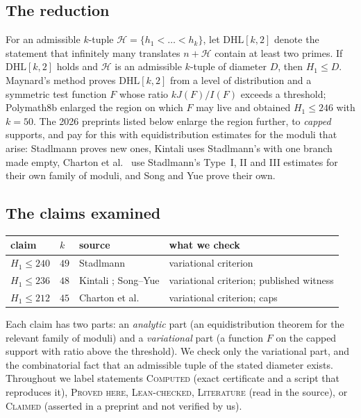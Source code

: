 \documentclass[11pt]{amsart}
\theoremstyle{definition}
\theoremstyle{remark}
\newcommand{\lbl}[1]{\textup{\textsc{#1}}}
\newcommand{\DHL}{\mathrm{DHL}}
\begin{document}
\subsection*{The reduction}
For an admissible $k$-tuple $\mathcal H=\{h_1<\dots<h_k\}$, let $\DHL[k,2]$
denote the statement that infinitely many translates $n+\mathcal H$ contain at
least two primes. If $\DHL[k,2]$ holds and $\mathcal H$ is an admissible
$k$-tuple of diameter $D$, then $H_1\le D$. Maynard's method \cite{May15}
proves $\DHL[k,2]$ from a level of distribution and a symmetric test function
$F$ whose ratio $kJ(F)/I(F)$ exceeds a threshold; Polymath8b \cite{Pol14b}
enlarged the region on which $F$ may live and obtained $H_1\le246$ with
$k=50$. The 2026 preprints listed below enlarge the region further, to
\emph{capped} supports, and pay for this with equidistribution estimates
for the moduli that arise: Stadlmann \cite{Sta26} proves new ones, Kintali
\cite{Kin26} uses Stadlmann's \cite[Prop.~3]{Sta26} with one branch made empty,
Charton et al.\ \cite{Cha26} use Stadlmann's Type~I, II and III estimates for
their own family of moduli, and Song and Yue \cite{SY26} prove their own.

\subsection*{The claims examined}
\begin{center}
\begin{tabular}{@{}llll@{}}
\toprule
claim & $k$ & source & what we check\\
\midrule
$H_1\le240$ & $49$ & Stadlmann \cite{Sta26} & variational criterion\\
$H_1\le236$ & $48$ & Kintali \cite{Kin26}; Song--Yue \cite{SY26} & variational criterion; published witness\\
$H_1\le212$ & $45$ & Charton et al.\ \cite{Cha26} & variational criterion; caps\\
\bottomrule
\end{tabular}
\end{center}
Each claim has two parts: an \emph{analytic} part (an equidistribution
theorem for the relevant family of moduli) and a \emph{variational} part (a
function $F$ on the capped support with ratio above the threshold). We check
only the variational part, and the combinatorial fact that an admissible
tuple of the stated diameter exists. Throughout we label statements
\lbl{Computed} (exact certificate and a script that reproduces it),
\lbl{Proved here}, \lbl{Lean-checked}, \lbl{Literature} (read in the source),
or \lbl{Claimed} (asserted in a preprint and not verified by us).
\end{document}
